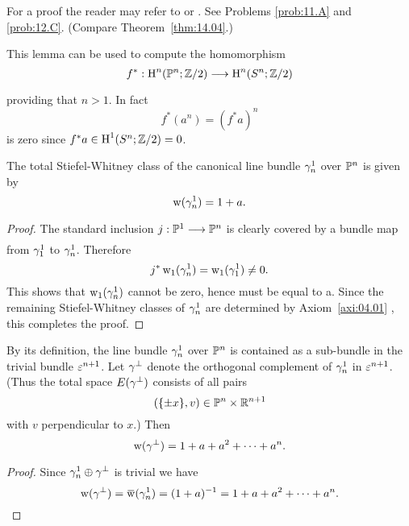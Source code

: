 \documentclass[../main]{subfiles}
\begin{document}
For a proof the reader may refer to \cite[$\S$ 4.3.3]{hilton1961} or \cite[p. 264]{spanier1981}. See Problems \ref{prob:11.A} and \ref{prob:12.C}. (Compare Theorem~\ref{thm:14.04}.)

\begin{remark}
\label{rem:04.02}
This lemma can be used to compute the homomorphism
\[
f^*: \homology^n(\projective^{n}; \mathbb{Z} / 2) \varrightarrow{} \homology^n(S^n ; \mathbb{Z} / 2)
\]
providing that $n>1$. In fact
\[
f^*(a^n)=(f^* a)^n
\]
is zero since $f^* a \in \operatorname{H}^1(S^n ; \mathbb{Z} / 2)=0$.
\end{remark}

\begin{example}
\label{exa:04.02}
The total Stiefel-Whitney class of the canonical line bundle $\gamma_{n}^{1}$ over $\mathbb{P}^{n}$ is given by
\[
\operatorname{w}(\gamma_{n}^{1})=1+a .
\]
\end{example}

\begin{proof}
The standard inclusion $j: \projective^1 \varrightarrow{} \projective^n$ is clearly covered by a bundle map from $\gamma_1^1$ to $\gamma_{n}^1$. Therefore
\[
j^* \operatorname{w}_1(\gamma_n^1)=\operatorname{w}_1(\gamma_1^1) \neq 0 .
\]
This shows that $\operatorname{w}_1(\gamma_n^1)$ cannot be zero, hence must be equal to a. Since the remaining Stiefel-Whitney classes of $\gamma_n^1$ are determined by Axiom~\ref{axi:04.01} , this completes the proof.
\end{proof}

\begin{example}
\label{exa:04.03}
By its definition, the line bundle $\gamma_n^1$ over $\mathbb{P}^n$ is contained as a \mbox{sub-bundle} in the trivial bundle $\varepsilon^{n+1}$. Let $\gamma^{\perp}$ denote the orthogonal \mbox{complement} of $\gamma_{n}^{1}$ in $\varepsilon^{n+1}$. (Thus the total space $E(\gamma^{\perp})$ consists of all pairs
\[
(\{\pm x\}, v) \in \mathbb{P}^{n} \times \mathbb{R}^{n+1}
\]
with $v$ perpendicular to $x$.) Then
\[
\operatorname{w}(\gamma^{\perp})=1+a+a^2+\cdots+a^n .
\]
\end{example}

\begin{proof}
Since $\gamma_{n}^{1} \oplus \gamma^{\perp}$ is trivial we have
\[
\sw(\tautological^{\perp})=\xoverline{\sw}(\tautological_n^1)=(1+a)^{-1}=1+a+a^2+\cdots+a^n .
\]
\end{proof}
\end{document}
